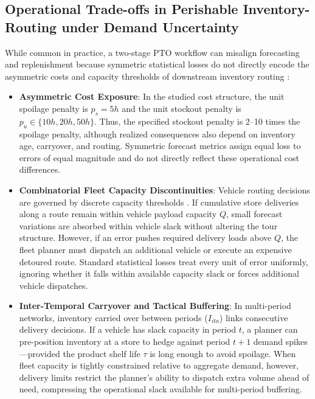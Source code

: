 \documentclass[11pt,a4paper]{article}
\theoremstyle{definition}
\theoremstyle{remark}
\begin{document}
\subsection{Operational Trade-offs in Perishable Inventory-Routing under Demand Uncertainty}
\label{subsec:operational_tradeoffs}

While common in practice, a two-stage PTO workflow can misalign forecasting and replenishment because symmetric statistical losses do not directly encode the asymmetric costs and capacity thresholds of downstream inventory routing \citep{elmachtoub2022smart,sadana2025survey}:
\begin{itemize}[leftmargin=*]
    \item \textbf{Asymmetric Cost Exposure}: In the studied cost structure, the unit spoilage penalty is $p_s=5h$ and the unit stockout penalty is $p_u \in \{10h,20h,50h\}$. Thus, the specified stockout penalty is 2--10 times the spoilage penalty, although realized consequences also depend on inventory age, carryover, and routing. Symmetric forecast metrics assign equal loss to errors of equal magnitude and do not directly reflect these operational cost differences.
    \item \textbf{Combinatorial Fleet Capacity Discontinuities}: Vehicle routing decisions are governed by discrete capacity thresholds \citep{solomon1987algorithms,miller1960integer}. If cumulative store deliveries along a route remain within vehicle payload capacity $Q$, small forecast variations are absorbed within vehicle slack without altering the tour structure. However, if an error pushes required delivery loads above $Q$, the fleet planner must dispatch an additional vehicle or execute an expensive detoured route. Standard statistical losses treat every unit of error uniformly, ignoring whether it falls within available capacity slack or forces additional vehicle dispatches.
    \item \textbf{Inter-Temporal Carryover and Tactical Buffering}: In multi-period networks, inventory carried over between periods ($I_{ita}$) links consecutive delivery decisions. If a vehicle has slack capacity in period $t$, a planner can pre-position inventory at a store to hedge against period $t+1$ demand spikes---provided the product shelf life $\tau$ is long enough to avoid spoilage. When fleet capacity is tightly constrained relative to aggregate demand, however, delivery limits restrict the planner's ability to dispatch extra volume ahead of need, compressing the operational slack available for multi-period buffering.
\end{itemize}
\end{document}

